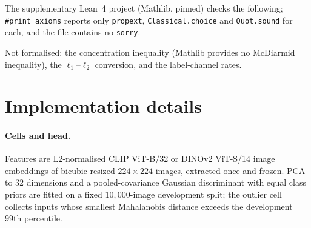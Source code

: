 The supplementary Lean~4 project (Mathlib, pinned) checks the following; \texttt{\#print axioms}
reports only \texttt{propext}, \texttt{Classical.choice} and \texttt{Quot.sound} for each, and the file
contains no \texttt{sorry}.

\begin{center}\small
{}
\end{center}
Not formalised: the concentration inequality (Mathlib provides no McDiarmid inequality), the
$\ell_1$--$\ell_2$ conversion, and the label-channel rates.

\section{Implementation details}
\label{app:details}

\paragraph{Cells and head.} Features are L2-normalised CLIP ViT-B/32 or DINOv2 ViT-S/14 image
embeddings of bicubic-resized $224\times224$ images, extracted once and frozen. PCA to 32 dimensions
and a pooled-covariance Gaussian discriminant with equal class priors are fitted on a fixed
$10{,}000$-image development split; the outlier cell collects inputs whose smallest Mahalanobis
distance exceeds the development 99th percentile.

